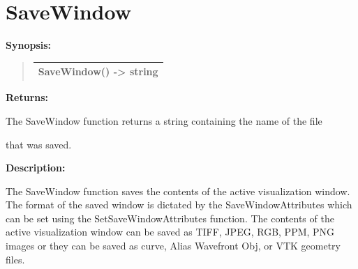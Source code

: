 \documentclass[letterpaper,10pt,english]{sphinxmanual}
\begin{document}
\section{SaveWindow}
\label{functions:savewindow}
\begin{DUlineblock}{0em}
\item[] \textbf{Synopsis:}
\end{DUlineblock}
\begin{quote}

\begin{tabulary}{\linewidth}{|L|}
\hline

SaveWindow() -\textgreater{} string
\\
\hline\end{tabulary}

\end{quote}

\begin{DUlineblock}{0em}
\item[] 
\item[] \textbf{Returns:}
\item[] The SaveWindow function returns a string containing the name of the file
\item[] that was saved.
\item[] 
\item[] \textbf{Description:}
\item[] The SaveWindow function saves the contents of the active visualization
window. The format of the saved window is dictated by the
SaveWindowAttributes which can be set using the SetSaveWindowAttributes
function. The contents of the active visualization window can be saved as
TIFF, JPEG, RGB, PPM, PNG images or they can be saved as curve, Alias
Wavefront Obj, or VTK geometry files.
\end{DUlineblock}

\begin{DUlineblock}{0em}
\item[] 
\end{DUlineblock}
\end{document}
